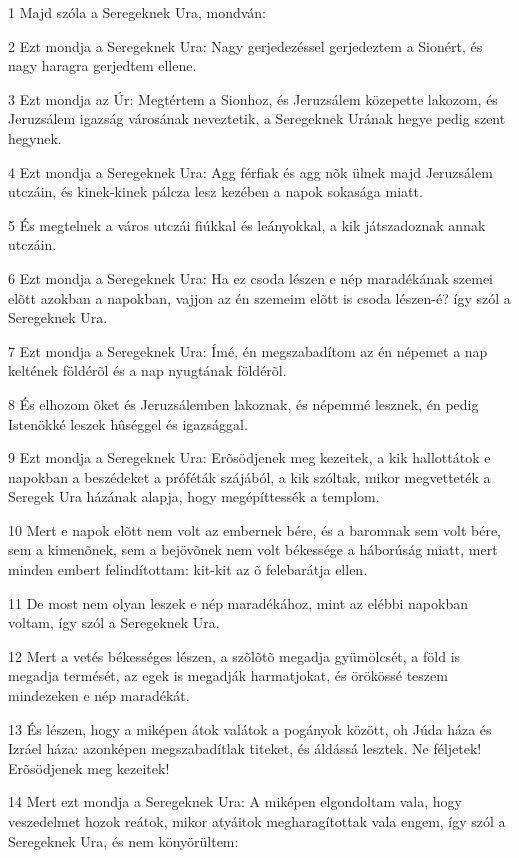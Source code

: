 \par 1 Majd szóla a Seregeknek Ura, mondván:
\par 2 Ezt mondja a Seregeknek Ura: Nagy gerjedezéssel gerjedeztem a Sionért, és nagy haragra gerjedtem ellene.
\par 3 Ezt mondja az Úr: Megtértem a Sionhoz, és Jeruzsálem közepette lakozom, és Jeruzsálem igazság városának neveztetik, a Seregeknek Urának hegye pedig szent hegynek.
\par 4 Ezt mondja a Seregeknek Ura: Agg férfiak és agg nõk ülnek majd Jeruzsálem utczáin, és kinek-kinek pálcza lesz kezében a napok sokasága miatt.
\par 5 És megtelnek a város utczái fiúkkal és leányokkal, a kik játszadoznak annak utczáin.
\par 6 Ezt mondja a Seregeknek Ura: Ha ez csoda lészen e nép maradékának szemei elõtt azokban a napokban, vajjon az én szemeim elõtt is csoda lészen-é? így szól a Seregeknek Ura.
\par 7 Ezt mondja a Seregeknek Ura: Ímé, én megszabadítom az én népemet a nap keltének földérõl és a nap nyugtának földérõl.
\par 8 És elhozom õket és Jeruzsálemben lakoznak, és népemmé lesznek, én pedig Istenökké leszek hûséggel és igazsággal.
\par 9 Ezt mondja a Seregeknek Ura: Erõsödjenek meg kezeitek, a kik hallottátok e napokban a beszédeket a próféták szájából, a kik szóltak, mikor megvetteték a Seregek Ura házának alapja, hogy megépíttessék  a templom.
\par 10 Mert e napok elõtt nem volt az embernek bére, és a baromnak sem volt bére, sem a kimenõnek, sem a bejövõnek nem volt békessége a háborúság miatt, mert minden embert felindítottam: kit-kit az õ felebarátja ellen.
\par 11 De most nem olyan leszek e nép maradékához, mint az elébbi napokban voltam, így szól a Seregeknek Ura.
\par 12 Mert a vetés békességes lészen, a szõlõtõ megadja gyümölcsét, a föld is megadja termését, az egek is megadják harmatjokat, és örökössé teszem mindezeken e nép maradékát.
\par 13 És lészen, hogy a miképen átok valátok a pogányok között, oh Júda háza és Izráel háza: azonképen megszabadítlak titeket, és áldássá lesztek. Ne féljetek! Erõsödjenek meg kezeitek!
\par 14 Mert ezt mondja a Seregeknek Ura: A miképen elgondoltam vala, hogy veszedelmet hozok reátok, mikor atyáitok megharagítottak vala engem, így szól a Seregeknek Ura, és nem könyörültem:

